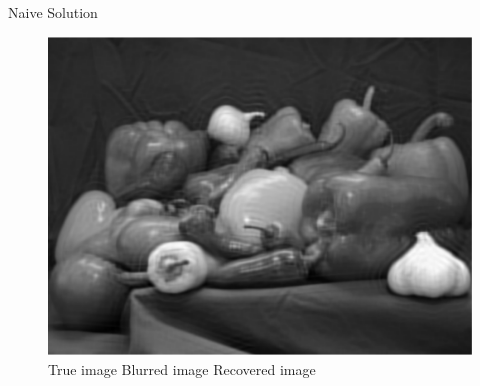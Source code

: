 \documentclass[12pt]{beamer}
\begin{document}
\begin{frame}{Naive Solution}
\begin{figure}
\includegraphics[scale=0.2]{../figures/fig3} \\
\small{\hspace{1em} True image \hspace{4em} Blurred image \hspace{3em} Recovered image}
\end{figure}
\end{frame}
\end{document}
